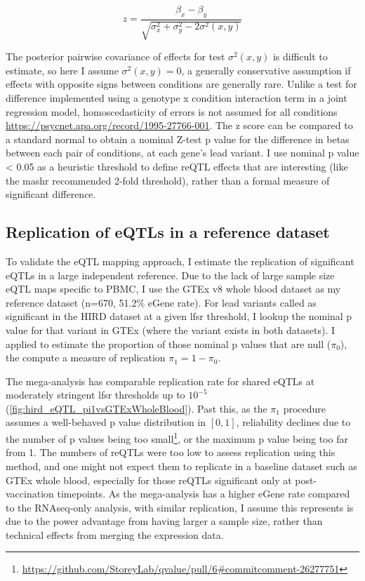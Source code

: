 \begin{equation}
z = \frac{\beta_x - \beta_y}{\sqrt{\sigma_x^2 + \sigma_y^2 - 2\sigma^2(x, y)}}
\end{equation}

The posterior pairwise covariance of effects for test $\sigma^2(x, y)$ is difficult to estimate, so here I assume $\sigma^2(x, y) = 0$, a generally conservative assumption if effects with opposite signs between conditions are generally rare.
Unlike a test for difference implemented using a genotype x condition interaction term in a joint regression model, homoscedasticity of errors is not assumed for all conditions \url{https://psycnet.apa.org/record/1995-27766-001}.
The z score can be compared to a standard normal to obtain a nominal Z-test p value for the difference in betas between each pair of conditions, at each gene's lead variant.
I use nominal p value < 0.05 as a heuristic threshold to define reQTL effects that are interesting (like the mashr recommended 2-fold threshold), rather than a formal measure of significant difference.

\subsection{Replication of eQTLs in a reference dataset}

To validate the \gls{eQTL} mapping approach, I estimate the replication of significant eQTLs in a large independent reference.
Due to the lack of large sample size \gls{eQTL} maps specific to \gls{PBMC}, I use the GTEx v8 whole blood dataset as my reference dataset (n=670, 51.2\% eGene rate).
For lead variants called as significant in the \gls{HIRD} dataset at a given lfsr threshold, I lookup the nominal p value for that variant in GTEx (where the variant exists in both datasets).
I applied  to estimate the proportion of those nominal p values that are null ($\pi_0$), the compute a measure of replication $\pi_1 = 1 - \pi_0$.

The mega-analysis has comparable replication rate for shared \glspl{eQTL} at moderately stringent \gls{lfsr} thresholds up to $10^{-5}$ (\autoref{fig:hird_eQTL_pi1vsGTExWholeBlood}).
Past this, as the $\pi_1$ procedure assumes a well-behaved p value distribution in $\left[0, 1\right]$, reliability declines due to the number of p values being too small\footnote{\url{https://github.com/StoreyLab/qvalue/pull/6\#commitcomment-26277751}}, or the maximum p value being too far from 1.
The numbers of \glspl{reQTL} were too low to assess replication using this method, and one might not expect them to replicate in a baseline dataset such as GTEx whole blood, especially for those \glspl{reQTL} significant only at post-vaccination timepoints.
As the mega-analysis has a higher eGene rate  compared to the \gls{RNAseq}-only analysis, with similar replication,
I assume this represents is due to the power advantage from having larger a sample size, rather than technical effects from merging the expression data.

